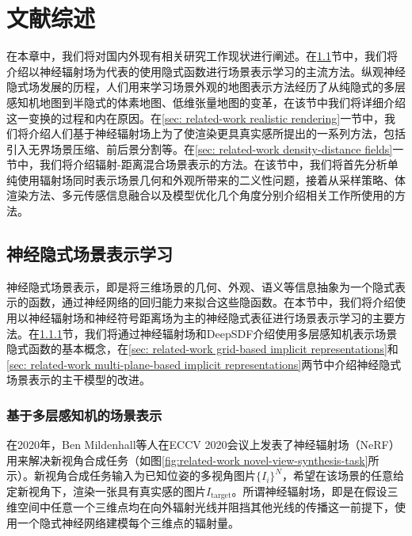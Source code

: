 \chapter{文献综述}
在本章中，我们将对国内外现有相关研究工作现状进行阐述。在\ref{sec: related-work implicit scene representation learning}节中，我们将介绍以神经辐射场\cite{mildenhall_nerf_2020}为代表的使用隐式函数进行场景表示学习的主流方法。纵观神经隐式场发展的历程，人们用来学习场景外观的地图表示方法经历了从纯隐式的多层感知机地图到半隐式的体素地图、低维张量地图的变革，在该节中我们将详细介绍这一变换的过程和内在原因。在\ref{sec: related-work realistic rendering}一节中，我们将介绍人们基于神经辐射场上为了使渲染更具真实感所提出的一系列方法，包括引入无界场景压缩、前后景分割等。在\ref{sec: related-work density-distance fields}一节中，我们将介绍辐射-距离混合场景表示的方法。在该节中，我们将首先分析单纯使用辐射场同时表示场景几何和外观所带来的二义性问题，接着从采样策略、体渲染方法、多元传感信息融合以及模型优化几个角度分别介绍相关工作所使用的方法。

\section{神经隐式场景表示学习}
\label{sec: related-work implicit scene representation learning}

神经隐式场景表示，即是将三维场景的几何、外观、语义等信息抽象为一个隐式表示的函数，通过神经网络的回归能力来拟合这些隐函数。在本节中，我们将介绍使用以神经辐射场和神经符号距离场为主的神经隐式表征进行场景表示学习的主要方法。在\ref{sec: related-work MLP-based neural implicit representations}节，我们将通过神经辐射场和DeepSDF介绍使用多层感知机表示场景隐式函数的基本概念，在\ref{sec: related-work grid-based implicit representations}和\ref{sec: related-work multi-plane-based implicit representations}两节中介绍神经隐式场景表示的主干模型的改进。


\subsection{基于多层感知机的场景表示}
\label{sec: related-work MLP-based neural implicit representations}

在2020年，Ben Mildenhall等人在ECCV 2020会议上发表了神经辐射场\cite{mildenhall_nerf_2020}（NeRF）用来解决新视角合成任务（如图\ref{fig:related-work novel-view-synthesis-task}所示）。新视角合成任务输入为已知位姿的多视角图片$\{{I}_i\}^N$，希望在该场景的任意给定新视角下，渲染一张具有真实感的图片${I}_\text{target}$。所谓神经辐射场，即是在假设三维空间中任意一个三维点均在向外辐射光线并阻挡其他光线的传播这一前提下，使用一个隐式神经网络建模每个三维点的辐射量。

